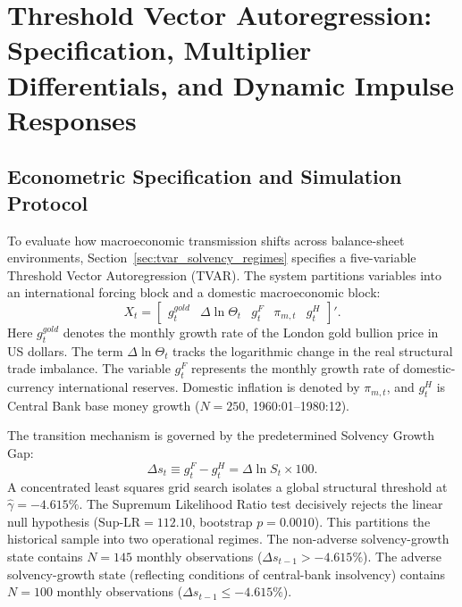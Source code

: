 \section{Threshold Vector Autoregression: Specification, Multiplier Differentials, and Dynamic Impulse Responses}
\label{app:tvar_girf_atlas}

\subsection{Econometric Specification and Simulation Protocol}
To evaluate how macroeconomic transmission shifts across balance-sheet environments, Section~\ref{sec:tvar_solvency_regimes} specifies a five-variable Threshold Vector Autoregression (TVAR). The system partitions variables into an international forcing block and a domestic macroeconomic block:
\begin{equation}
    X_t = \begin{bmatrix} g^{gold}_t & \Delta \ln \Theta_t & g^F_t & \pi_{m,t} & g^H_t \end{bmatrix}'.
    \label{eq:app_d_vector}
\end{equation}
Here $g^{gold}_t$ denotes the monthly growth rate of the London gold bullion price in US dollars. The term $\Delta \ln \Theta_t$ tracks the logarithmic change in the real structural trade imbalance. The variable $g^F_t$ represents the monthly growth rate of domestic-currency international reserves. Domestic inflation is denoted by $\pi_{m,t}$, and $g^H_t$ is Central Bank base money growth ($N=250$, 1960:01--1980:12).

The transition mechanism is governed by the predetermined Solvency Growth Gap:
\begin{equation}
    \Delta s_t \equiv g^F_t - g^H_t = \Delta \ln S_t \times 100.
    \label{eq:app_d_solvency_gap}
\end{equation}
A concentrated least squares grid search isolates a global structural threshold at $\hat{\gamma} = -4.615\%$. The \citet{Hansen1999} Supremum Likelihood Ratio test decisively rejects the linear null hypothesis ($\text{Sup-LR} = 112.10$, bootstrap $p = 0.0010$). This partitions the historical sample into two operational regimes. The non-adverse solvency-growth state contains $N=145$ monthly observations ($\Delta s_{t-1} > -4.615\%$). The adverse solvency-growth state (reflecting conditions of central-bank insolvency) contains $N=100$ monthly observations ($\Delta s_{t-1} \le -4.615\%$).

